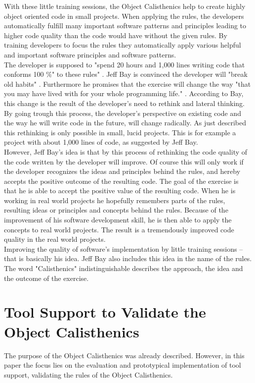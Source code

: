 With these little training sessions, the Object Calisthenics help to create highly object oriented code  in small projects. When applying the rules, the developers automatically fulfill many important software patterns and principles leading to higher code quality than the code would have without the given rules. By training developers to focus the rules they automatically apply various helpful and important software principles and software patterns. \\

The developer is supposed to "spend 20 hours and 1,000 lines writing code that conforms 100 \%"  to these rules" \cite[p. 80]{oc2008}. Jeff Bay is convinced the developer will "break old habits" \cite[p. 80]{oc2008}. Furthermore he promises that the exercise will change the way "that you may have lived with for your whole programming life." \cite[p. 80]{oc2008}. According to Bay, this change is the result of the developer's need to rethink and lateral thinking. By going trough this process, the developer's perspective on existing code and the way he will write code in the future, will change radically. As just described this rethinking is only possible in small, lucid projects. This is for example a project with about 1,000 lines of code, as suggested by Jeff Bay. \\

However, Jeff Bay's idea is that by this process of rethinking the code quality of the code written by the developer will improve.
Of course this will only work if the developer recognizes the ideas and principles behind the rules, and hereby accepts the positive outcome of the resulting code. The goal of the exercise is that he is able to accept the positive value of the resulting code. When he is working in real world projects he hopefully remembers parts of the rules, resulting ideas or principles and concepts behind the rules. Because of the improvement of his software development skill, he is then able to apply the concepts to real world projects. The result is a tremendously improved code quality in the real world projects.\\

Improving the quality of software's implementation by little training sessions -- that is basically his idea. Jeff Bay also includes this idea in the name of the rules. The word "Calisthenics" indistinguishable describes the approach, the idea and the outcome of the exercise.\\

\section{Tool Support to Validate the Object Calisthenics}
The purpose of the Object Calisthenics was already described. However, in this paper the focus lies on the evaluation and prototypical implementation of tool support, validating the rules of the Object Calisthenics. \\

